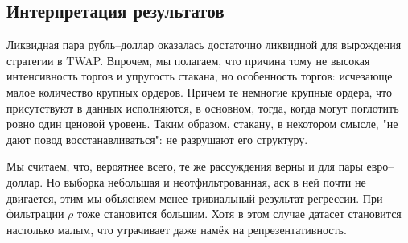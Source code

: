 \subsection{Интерпретация результатов}

Ликвидная пара рубль--доллар оказалась достаточно ликвидной для вырождения стратегии 
в TWAP. Впрочем, мы полагаем, что причина тому не высокая интенсивность торгов и упругость стакана,
но особенность торгов: исчезающе малое количество крупных ордеров. Причем те немногие крупные ордера,
что присутствуют в данных исполняются, в основном, тогда, когда могут поглотить ровно один ценовой уровень.
Таким образом, стакану, в некотором смысле, "не дают повод восстанавливаться": не разрушают его структуру.
\par
Мы считаем, что, вероятнее всего, те же рассуждения верны и для пары евро--доллар. Но выборка небольшая и неотфильтрованная,
аск в ней почти не двигается, этим мы объясняем менее тривиальный результат регрессии. При фильтрации $\rho$ тоже становится большим.
Хотя в этом случае датасет становится настолько малым, что утрачивает даже намёк на репрезентативность.

